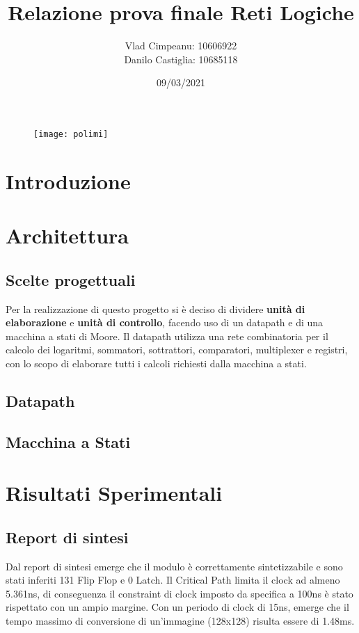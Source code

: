 \documentclass{article}
\title{Relazione prova finale Reti Logiche}
\date{09/03/2021}
\author{Vlad Cimpeanu: 10606922\\ Danilo Castiglia: 10685118}
\begin{document}
\maketitle
{}


\begin{figure}[h!] %
\centering
  \texttt{[image: polimi]}
  \label{fig:polimi}
\end{figure}

\newpage

\section{Introduzione}


\section{Architettura}
\subsection{Scelte progettuali}
Per la realizzazione di questo progetto si è deciso di dividere \textbf{unità di elaborazione} e \textbf{unità di controllo}, facendo uso di un datapath e di una macchina a stati di Moore. Il datapath utilizza una rete combinatoria per il calcolo dei logaritmi, sommatori, sottrattori, comparatori, multiplexer e registri, con lo scopo di elaborare tutti i calcoli richiesti dalla macchina a stati.

\subsection{Datapath}

\subsection{Macchina a Stati}



%

\section{Risultati Sperimentali}
\subsection{Report di sintesi}
Dal report di sintesi emerge che il modulo è correttamente sintetizzabile e sono stati inferiti 131 Flip Flop e 0 Latch. Il Critical Path limita il clock ad almeno 5.361ns, di conseguenza il constraint di clock imposto da specifica a 100ns è stato rispettato con un ampio margine.
Con un periodo di clock di 15ns, emerge che il tempo massimo di conversione di un'immagine (128x128) risulta essere di 1.48ms.
\end{document}
